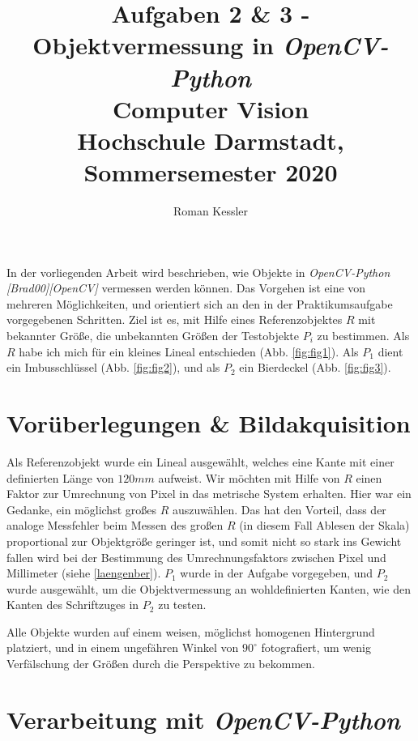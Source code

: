 \documentclass{article}
\begin{document}
\title{Aufgaben 2 \& 3 - Objektvermessung in \textit{OpenCV-Python} \\
		\large Computer Vision \\
    		Hochschule Darmstadt, Sommersemester 2020}

\author{Roman Kessler}

\maketitle








In der vorliegenden Arbeit wird beschrieben, wie Objekte in \textit{OpenCV-Python} \textit{[Brad00][OpenCV]} vermessen werden können. Das Vorgehen ist eine von mehreren Möglichkeiten, und orientiert sich an den in der Praktikumsaufgabe vorgegebenen Schritten. Ziel ist es, mit Hilfe eines Referenzobjektes $R$ mit bekannter Größe, die unbekannten Größen der Testobjekte $P_{i}$ zu bestimmen. Als $R$ habe ich mich für ein kleines Lineal entschieden (Abb. \ref{fig:fig1}). Als $P_{1}$ dient ein Imbusschlüssel (Abb. \ref{fig:fig2}), und als $P_{2}$ ein Bierdeckel (Abb. \ref{fig:fig3}).

\section{Vorüberlegungen \& Bildakquisition}

Als Referenzobjekt wurde ein Lineal ausgewählt, welches eine Kante mit einer definierten Länge von $120mm$ aufweist. Wir möchten mit Hilfe von $R$ einen Faktor zur Umrechnung von Pixel in das metrische System erhalten. Hier war ein Gedanke, ein möglichst großes $R$ auszuwählen. Das hat den Vorteil, dass der analoge Messfehler beim Messen des großen $R$ (in diesem Fall Ablesen der Skala) proportional zur Objektgröße geringer ist, und somit nicht so stark ins Gewicht fallen wird bei der Bestimmung des Umrechnungsfaktors zwischen Pixel und Millimeter (siehe \ref{laengenber}). $P_{1}$ wurde in der Aufgabe vorgegeben, und $P_{2}$ wurde ausgewählt, um die Objektvermessung an wohldefinierten Kanten, wie den Kanten des Schriftzuges in $P_{2}$ zu testen.

Alle Objekte wurden auf einem weisen, möglichst homogenen Hintergrund platziert, und in einem ungefähren Winkel von $90^{\circ}$ fotografiert, um wenig Verfälschung der Größen durch die Perspektive zu bekommen.

\section{Verarbeitung mit \textit{OpenCV-Python}}
\end{document}
